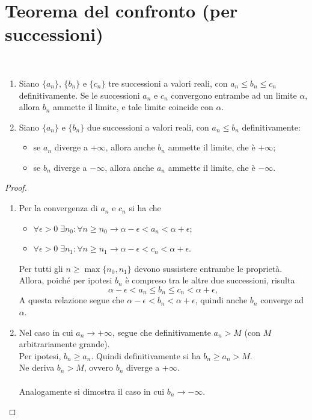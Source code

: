 \documentclass[a4paper,12pt, oneside]{book}
\begin{document}
\section{Teorema del confronto (per successioni)}
\begin{teorema} \
	\begin{enumerate}
		\item Siano $\{a_n\}$, $\{b_n\}$ e $\{c_n\}$ tre successioni a valori reali, con $a_n\leq b_n\leq c_n$ definitivamente. Se le successioni $a_n$ e $c_n$ convergono entrambe ad un limite $\alpha$, allora $b_n$ ammette il limite, e tale limite coincide con $\alpha$.
		\item Siano $\{a_n\}$ e $\{b_n\}$ due successioni a valori reali, con $a_n\leq b_n$ definitivamente:
		      \begin{itemize}
			      \item se $a_n$ diverge a $+\infty$, allora anche $b_n$ ammette il limite, che è $+\infty$;
			      \item se $b_n$ diverge a $-\infty$, allora anche $a_n$ ammette il limite, che è $-\infty$.
		      \end{itemize}
	\end{enumerate}
\end{teorema}
\begin{proof}\
	\begin{enumerate}
		\item Per la convergenza di $a_n$ e $c_n$ si ha che
		      \begin{itemize}
			      \item $\forall\epsilon>0\;\exists n_0\colon\forall n\geq n_0\to\alpha-\epsilon<a_n<\alpha+\epsilon$;
			      \item $\forall\epsilon>0\;\exists n_1\colon\forall n\geq n_1\to\alpha-\epsilon<c_n<\alpha+\epsilon$.
		      \end{itemize}
		      Per tutti gli $n\geq\max\{n_0,n_1\}$ devono sussistere entrambe le proprietà. Allora, poiché per ipotesi $b_n$ è compreso tra le altre due successioni, risulta
		      \[
			      \alpha-\epsilon<a_n\leq b_n\leq c_n<\alpha+\epsilon,
		      \]
		      A questa relazione segue che $\alpha-\epsilon<b_n<\alpha+\epsilon$, quindi anche $b_n$ converge ad $\alpha$.
		\item Nel caso in cui $a_n\to +\infty$, segue che definitivamente $a_n>M$ (con $M$ arbitrariamente grande).\\
		      Per ipotesi, $b_n\geq a_n$. Quindi definitivamente si ha $b_n\geq a_n>M$.\\
		      Ne deriva $b_n>M$, ovvero $b_n$ diverge a $+\infty$.\\\\
		      Analogamente si dimostra il caso in cui $b_n\to -\infty$.\qedhere
	\end{enumerate}
\end{proof}
\end{document}

